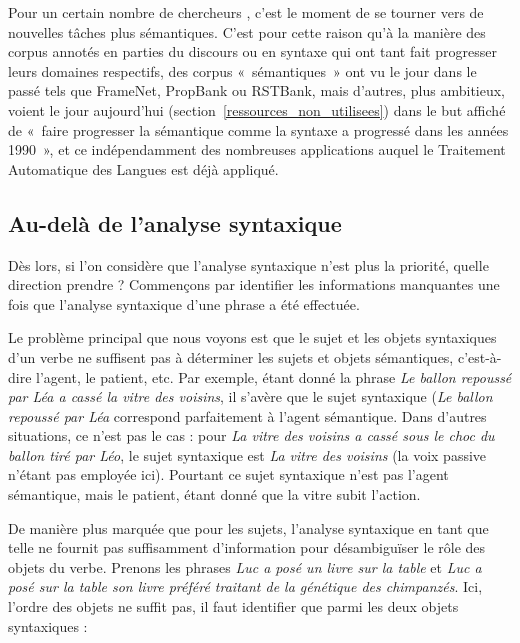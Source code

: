 Pour un certain nombre de chercheurs
\citep{bos2012annotating,banarescu2013abstract}, c'est le moment de se tourner
vers de nouvelles tâches plus sémantiques. C'est pour cette raison qu'à la
manière des corpus annotés en parties du discours ou en syntaxe qui ont tant
fait progresser leurs domaines respectifs, des corpus «~sémantiques~» ont vu le
jour dans le passé tels que FrameNet, PropBank ou RSTBank, mais d'autres, plus
ambitieux, voient le jour aujourd'hui
\citep{bos2012annotating,banarescu2013abstract}
(section~\ref{ressources_non_utilisees}) dans le but affiché de «~faire
progresser la sémantique comme la syntaxe a progressé dans les années 1990~»,
et ce indépendamment des nombreuses applications auquel le Traitement
Automatique des Langues est déjà appliqué.

\subsection{Au-delà de l'analyse syntaxique}
\label{au_dela}

Dès lors, si l'on considère que l'analyse syntaxique n'est plus la priorité,
quelle direction prendre ? Commençons par identifier les informations
manquantes une fois que l'analyse syntaxique d'une phrase a été effectuée.

Le problème principal que nous voyons est que le sujet et les objets
syntaxiques d'un verbe ne suffisent pas à déterminer les sujets et objets
sémantiques, c'est-à-dire l'agent, le patient, etc. Par exemple, étant donné la
phrase \textit{Le ballon repoussé par Léa a cassé la vitre des voisins}, il
s'avère que le sujet syntaxique (\textit{Le ballon repoussé par Léa} correspond
parfaitement à l'agent sémantique.  Dans d'autres situations, ce n'est pas le
cas : pour \textit{La vitre des voisins a cassé sous le choc du ballon tiré par
Léo}, le sujet syntaxique est \textit{La vitre des voisins} (la voix passive
n'étant pas employée ici). Pourtant ce sujet syntaxique n'est pas l'agent
sémantique, mais le patient, étant donné que la vitre subit l'action.

De manière plus marquée que pour les sujets, l'analyse syntaxique en tant que
telle ne fournit pas suffisamment d'information pour désambiguïser le rôle des
objets du verbe.  Prenons les phrases \textit{Luc a posé un livre sur la table}
et \textit{Luc a posé sur la table son livre préféré traitant de la génétique des
chimpanzés}.  Ici, l'ordre des objets ne suffit pas, il faut identifier que
parmi les deux objets syntaxiques :


